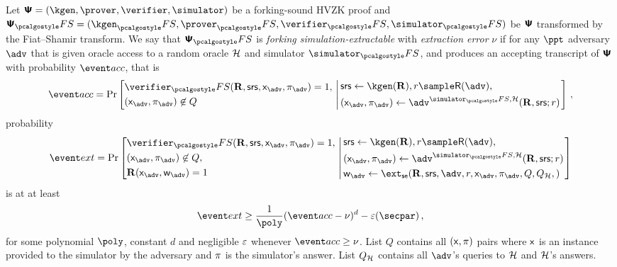 \documentclass[runningheads,10pt]{llncs}
\begin{document}
\begin{definition}
	\label{def:simext}
	Let $\ps = (\kgen, \prover, \verifier, \simulator)$ be a forking-sound HVZK
  proof and $\ps_\fs = (\kgen_\fs, \prover_\fs, \verifier_\fs, \simulator_\fs)$
  be $\bm{\mathsf{\Psi}}$ transformed by the Fiat--Shamir transform. We say that $\ps_\fs$ is
  \emph{forking simulation-extractable} with \emph{extraction error} $\nu$ if
  for any $\ppt$ adversary $\adv$ that is given oracle access to a random oracle
  $\mathcal{H}$ and simulator $\simulator_\fs$, and produces an accepting transcript of
  $\bm{\mathsf{\Psi}}$ with probability $\accProb$, that is
	\[
		\accProb = \Pr \left[
		\begin{aligned}
			& \verifier_\fs(\REL, \srs, \inp_{\advse}, \zkproof_{\advse}) = 1,\\
			& (\inp_{\advse}, \zkproof_{\advse}) \not\in Q
		\end{aligned}
		\, \left| \,
		\begin{aligned}
			& \srs \gets \kgen(\REL), r \sample \RND{\advse}, \\
			& (\inp_{\advse}, \zkproof_{\advse}) \gets \advse^{\simulator_\fs,
			\ro} (\REL, \srs; r) 
		\end{aligned}
		\right.\right]\,,
	\]
	probability
	\[
		\extProb = \Pr \left[
		\begin{aligned}
			& \verifier_\fs(\REL, \srs, \inp_{\advse}, \zkproof_{\advse}) = 1,\\
			& (\inp_{\advse}, \zkproof_{\advse}) \not\in Q,\\
			& \REL(\inp_{\advse}, \wit_{\advse}) = 1
		\end{aligned}
		\, \left| \,
		\begin{aligned}
			& \srs \gets \kgen(\REL), r \sample \RND{\advse},\\
			& (\inp_{\advse}, \zkproof_{\advse}) \gets \advse^{\simulator_\fs,
			\ro} (\REL, \srs; r) \\
			& \wit_{\advse} \gets \ext_\se (\REL, \srs, \advse, r, \inp_{\advse}, \zkproof_{\advse},
			Q, Q_\ro,) 
		\end{aligned}
		\right.\right]
	\]
	is at at least 
	\[
		\extProb \geq \frac{1}{\poly} (\accProb - \nu)^d - \eps(\secpar)\,,
	\]
	for some polynomial $\poly$, constant $d$ and negligible $\varepsilon$ whenever
  $\accProb \geq \nu$. List $Q$ contains all $(\mathsf{x}, \pi)$ pairs where
  $\mathsf{x}$ is an instance provided to the simulator by the adversary and
  $\pi$ is the simulator's answer. List $Q_{\mathcal{H}}$ contains all $\advse$'s
  queries to $\mathcal{H}$ and $\mathcal{H}$'s answers.
\end{definition}
\end{document}
